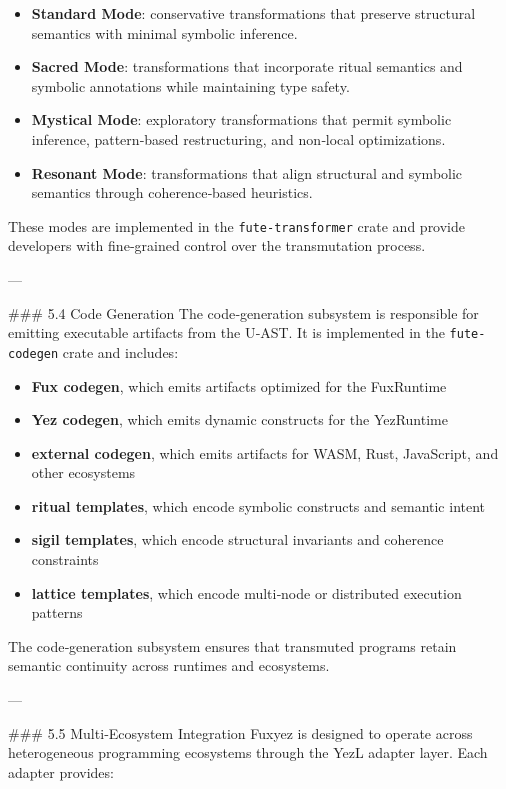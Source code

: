 \begin{itemize}
  \item \textbf{Standard Mode}: conservative transformations that preserve structural semantics with minimal symbolic inference.  
  \item \textbf{Sacred Mode}: transformations that incorporate ritual semantics and symbolic annotations while maintaining type safety.  
  \item \textbf{Mystical Mode}: exploratory transformations that permit symbolic inference, pattern‑based restructuring, and non‑local optimizations.  
  \item \textbf{Resonant Mode}: transformations that align structural and symbolic semantics through coherence‑based heuristics.
\end{itemize}

These modes are implemented in the \texttt{fute-transformer} crate and provide developers with fine‑grained control over the transmutation process.

---

\#\#\# 5.4 Code Generation  
The code‑generation subsystem is responsible for emitting executable artifacts from the U‑AST. It is implemented in the \texttt{fute-codegen} crate and includes:

\begin{itemize}
  \item \textbf{Fux codegen}, which emits artifacts optimized for the FuxRuntime  
  \item \textbf{Yez codegen}, which emits dynamic constructs for the YezRuntime  
  \item \textbf{external codegen}, which emits artifacts for WASM, Rust, JavaScript, and other ecosystems  
  \item \textbf{ritual templates}, which encode symbolic constructs and semantic intent  
  \item \textbf{sigil templates}, which encode structural invariants and coherence constraints  
  \item \textbf{lattice templates}, which encode multi‑node or distributed execution patterns  
\end{itemize}

The code‑generation subsystem ensures that transmuted programs retain semantic continuity across runtimes and ecosystems.

---

\#\#\# 5.5 Multi‑Ecosystem Integration  
Fuxyez is designed to operate across heterogeneous programming ecosystems through the YezL adapter layer. Each adapter provides:


